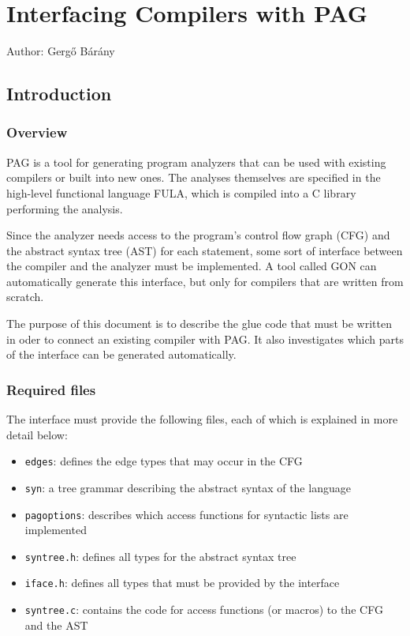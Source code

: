 \chapter{Interfacing Compilers with PAG}

Author: Gerg\H{o} B\'ar\'any


\section{Introduction}
\subsection{Overview}

PAG is a tool for generating program analyzers that can be used with
existing compilers or built into new ones. The analyses themselves
are specified in the high-level functional language FULA, which is
compiled into a C library performing the analysis.

Since the analyzer needs access to the program's control flow graph
(CFG) and the abstract syntax tree (AST) for each statement, some
sort of interface between the compiler and the analyzer must be
implemented. A tool called GON can automatically generate this
interface, but only for compilers that are written from scratch.

The purpose of this document is to describe the glue code that must
be written in oder to connect an existing compiler with PAG. It also
investigates which parts of the interface can be generated
automatically.

\subsection{Required files}

The interface must provide the following files, each of which is
explained in more detail below:
\begin{itemize}
\item \verb|edges|: defines the edge types that may occur in the CFG
\item \verb|syn|: a tree grammar describing the abstract syntax of
the language
\item \verb|pagoptions|: describes which access functions for
syntactic lists are implemented
\item \verb|syntree.h|: defines all types for the abstract syntax
tree
\item \verb|iface.h|: defines all types that must be provided by the
interface
\item \verb|syntree.c|: contains the code for access functions (or
macros) to the CFG and the AST
\end{itemize}

